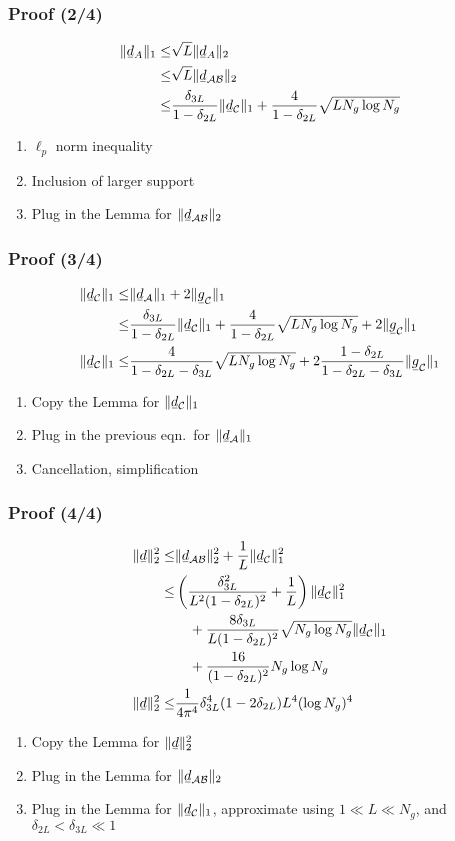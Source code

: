 \documentclass{beamer}
\newcommand{\Disp}[1]{\begin{align} #1 \end{align}}
\newcommand{\NT}{\notag}
\renewcommand{\d}{\delta}
\newcommand{\I}{\item}
\newcommand{\MC}[1]{\mathcal{#1}}
\newcommand{\R}[1]{\sqrt{#1}}
\newcommand{\F}[1]{\frac{#1}}
\newcommand{\V}[1]{\stackunder[1.2pt]{$#1$}{\rule{.9ex}{.075ex}}}
\begin{document}
\begin{frame}
\frametitle{Proof (2/4)}
\Disp{
\| \V{d}_{A} \|_1
\leq &\R{L} \| \V{d}_{A} \|_2 \NT \\
\leq &\R{L} \| \V{d}_{\MC{AB}} \|_2 \NT \\
\leq &\F {\d_{3L}} {1-\d_{2L}} \| \V{d}_{\MC{C}} \|_1 +\F {4} {1-\d_{2L}} \R{L N_g \log N_g} 
}
\begin{enumerate}
\I \(\ell_p\) norm inequality
\I Inclusion of larger support
\I Plug in the Lemma for \(\|\V{d}_{\MC{A}\MC{B}}\|_2\)
\end{enumerate}
\end{frame}

\begin{frame}
\frametitle{Proof (3/4)}
\Disp{
\| \V{d}_{\MC{C}} \|_1
\leq &\| \V{d}_{\MC{A}} \|_1 +2 \| \V{g}_{\MC{C}} \|_1 \NT \\
\leq &\F {\d_{3L}} {1-\d_{2L}} \| \V{d}_{\MC{C}} \|_1
+\F {4} {1-\d_{2L}} \R{L N_g \log N_g}
+2 \| \V{g}_{\MC{C}} \|_1 \\
\| \V{d}_{\MC{C}} \|_1
\leq &\F {4} {1-\d_{2L} -\d_{3L}} \R{L N_g \log N_g}
+2 \F{1-\d_{2L}} {1 -\d_{2L} -\d_{3L}} \| \V{g}_{\MC{C}} \|_1
}
\begin{enumerate}
\I Copy the Lemma for \(\| \V{d}_{\MC{C}} \|_1\)
\I Plug in the previous eqn.\ for \(\| \V{d}_{\MC{A}} \|_1\)
\I Cancellation, simplification
\end{enumerate}
\end{frame}

\begin{frame}
\frametitle{Proof (4/4)}
\Disp{
\| \V{d} \|_2^2
\leq &\|\V{d}_{\MC{A}\MC{B}}\|_2^2 +\F{1}{L} \|\V{d}_{\MC{C}}\|_1^2 \NT \\
\leq & \left( \F{\d_{3L}^2} {L^2 (1-\d_{2L})^2} +\F{1}{L} \right) \|\V{d}_{\MC{C}}\|_1^2 \NT \\
&\quad +\F{8 \d_{3L}} {L (1-\d_{2L})^2} \R{N_g \log N_g} \|\V{d}_{\MC{C}}\|_1 \NT \\
&\quad +\F{16}{(1-\d_{2L})^2} N_g \log N_g \\
\|\V{d}\|_2^2
\leq &\F{1}{4 \pi^4} \d_{3L}^4 (1-2\d_{2L}) L^4 ( \log N_g )^4
}
\begin{enumerate}
\I Copy the Lemma for \(\| \V{d} \|_2^2\)
\I Plug in the Lemma for \(\|\V{d}_{\MC{A}\MC{B}}\|_2\)
\I Plug in the Lemma for \(\|\V{d}_{\MC{C}}\|_1\), approximate using \(1 \ll L \ll N_g\), and \(\d_{2L} <\d_{3L} \ll 1\)
\end{enumerate}
\end{frame}
\end{document}
